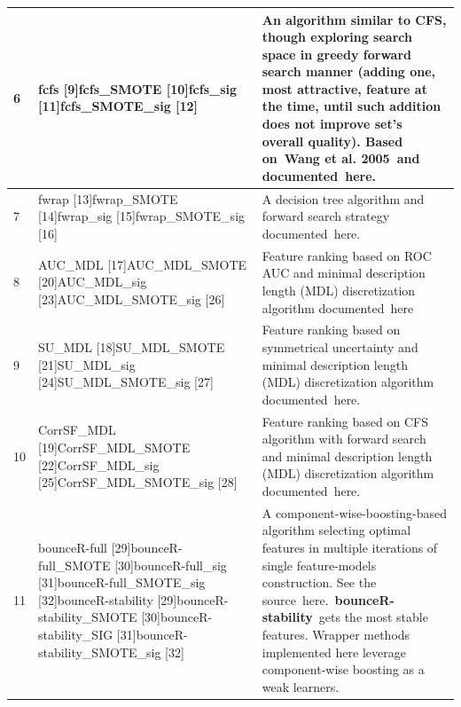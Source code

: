 \documentclass[article]{jss}
\begin{document}
\begin{tabular}{|p{0.2in}|p{2.0in}|p{3.9in}|}
6 & fcfs [9]\newline fcfs\_SMOTE [10]\newline fcfs\_sig [11]\newline fcfs\_SMOTE\_sig [12] & An algorithm similar to CFS, though exploring search space in greedy forward search manner (adding one, most attractive, feature at the time, until such addition does not improve set's overall quality). Based on~Wang et al. 2005~and documented~here. \\ \hline
7 & fwrap [13]\newline fwrap\_SMOTE [14]\newline fwrap\_sig [15]\newline fwrap\_SMOTE\_sig [16] & A decision tree algorithm and forward search strategy documented~here. \\ \hline
8 & AUC\_MDL [17]\newline AUC\_MDL\_SMOTE [20]\newline AUC\_MDL\_sig [23]\newline AUC\_MDL\_SMOTE\_sig [26] & Feature ranking based on ROC AUC and minimal description length (MDL) discretization algorithm documented~here\underbar{.} \\ \hline
9 & SU\_MDL [18]\newline SU\_MDL\_SMOTE [21]\newline SU\_MDL\_sig [24]\newline SU\_MDL\_SMOTE\_sig [27] & Feature ranking based on symmetrical uncertainty and minimal description length (MDL) discretization algorithm documented~here. \\ \hline
10 & CorrSF\_MDL [19]\newline CorrSF\_MDL\_SMOTE [22]\newline CorrSF\_MDL\_sig [25]\newline CorrSF\_MDL\_SMOTE\_sig [28] & Feature ranking based on CFS algorithm with forward search and minimal description length (MDL) discretization algorithm documented~here. \\ \hline
11 & bounceR-full [29]\newline bounceR-full\_SMOTE [30]\newline bounceR-full\_sig [31]\newline bounceR-full\_SMOTE\_sig [32]bounceR-stability [29]\newline bounceR-stability\_SMOTE [30]\newline bounceR-stability\_SIG [31]\newline bounceR-stability\_SMOTE\_sig [32] & A component-wise-boosting-based algorithm selecting optimal features in multiple iterations of single feature-models construction. See the source~here.~\textbf{bounceR-stability}~gets the most stable features. Wrapper methods implemented here leverage component-wise boosting as a weak learners. \\ \hline

\end{tabular}
\end{document}
